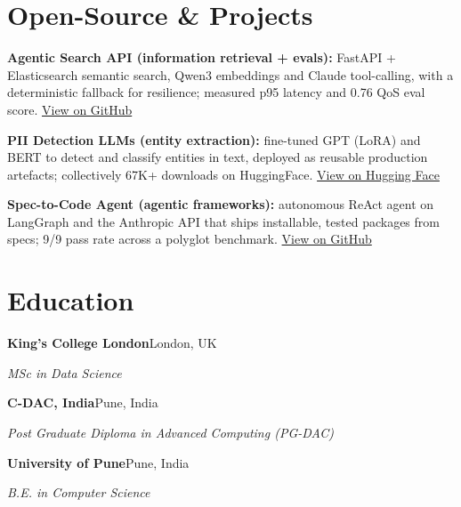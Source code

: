 \documentclass[10pt,a4paper]{article}
\begin{document}
\section{Open-Source \& Projects}
\begin{tight}
  \item \textbf{Agentic Search API (information retrieval + evals):} FastAPI + Elasticsearch semantic search, Qwen3 embeddings and Claude tool-calling, with a deterministic fallback for resilience; measured p95 latency and 0.76 QoS eval score. \href{https://github.com/abhijeetscode/search-agent}{View on GitHub}
  \item \textbf{PII Detection LLMs (entity extraction):} fine-tuned GPT (LoRA) and BERT to detect and classify entities in text, deployed as reusable production artefacts; collectively 67K+ downloads on HuggingFace. \href{https://huggingface.co/ab-ai/pii_model}{View on Hugging Face}
  \item \textbf{Spec-to-Code Agent (agentic frameworks):} autonomous ReAct agent on LangGraph and the Anthropic API that ships installable, tested packages from specs; 9/9 pass rate across a polyglot benchmark. \href{https://github.com/abhijeetscode/Spec-to-Code-Agent}{View on GitHub}
\end{tight}

\section{Education}
{\color{company}\bfseries King's College London}\hfill {\color{muted}London, UK}\par
{\itshape MSc in Data Science}\par\vspace{2pt}
{\color{company}\bfseries C-DAC, India}\hfill {\color{muted}Pune, India}\par
{\itshape Post Graduate Diploma in Advanced Computing (PG-DAC)}\par\vspace{2pt}
{\color{company}\bfseries University of Pune}\hfill {\color{muted}Pune, India}\par
{\itshape B.E. in Computer Science}\par
\end{document}
